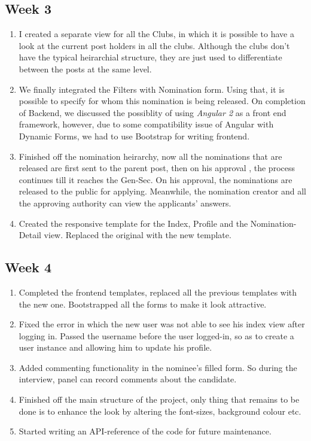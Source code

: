\documentclass[12pt,a4paper]{scrartcl}
\begin{document}
\subsection{Week 3}
\begin{enumerate}
	\item I created a separate view for all the Clubs, in which it is possible to have a look at the current post holders in all the clubs.
	Although the clubs don't have the typical heirarchial structure, they are just used to differentiate between the posts at the same level.
	\item We finally integrated the Filters with Nomination form. Using that, it is possible to specify for whom this nomination is being released. On completion of Backend, we discussed the possiblity of using \textit{Angular 2} as a front end framework, however, due to some compatibility issue of Angular with Dynamic Forms, we had to use Bootstrap for writing frontend.
	\item Finished off the nomination heirarchy, now all the nominations that are released are first sent to the parent post, then on his approval , the process continues till it reaches the Gen-Sec. On his approval, the nominations are released to the public for applying.
	Meanwhile, the nomination creator and all the approving authority can view the applicants' answers.
	\item Created the responsive template for the Index, Profile and the Nomination-Detail view. Replaced the original with the new template. 
\end{enumerate}

\subsection{Week 4}
\begin{enumerate}
	\item Completed the frontend templates, replaced all the previous templates with the new one. Bootstrapped all the forms to make it look attractive. 
	\item Fixed the error in which the new user was not able to see his index view after logging in. Passed the username before the user logged-in, so as to create a user instance and allowing him to update his profile.
	\item Added commenting functionality in the nominee's filled form. So during the interview, panel can record comments about the candidate.
	\item Finished off the main structure of the project, only thing that remains to be done is to enhance the look by altering the font-sizes, background colour etc.
	\item Started writing an API-reference of the code for future maintenance. 
\end{enumerate}
\end{document}
